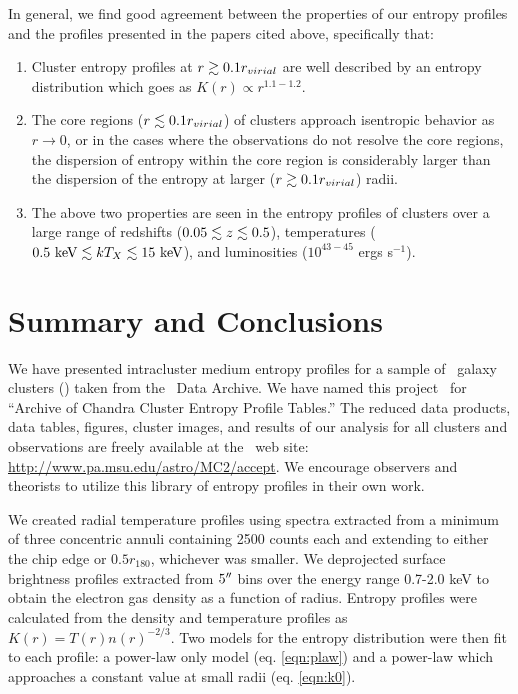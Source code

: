 \documentclass[12pt,preprint]{aastex}
\begin{document}
In general, we find good agreement between the properties of our
entropy profiles and the profiles presented in the papers cited above,
specifically that:
\begin{enumerate}
\item Cluster entropy profiles at $r \gtrsim 0.1 r_{virial}$ are well
  described by an entropy distribution which goes as $K(r) \propto
  r^{1.1-1.2}$.
\item The core regions ($r \lesssim 0.1 r_{virial}$) of clusters approach
  isentropic behavior as $r \rightarrow 0$, or in the cases where the
  observations do not resolve the core regions, the dispersion of
  entropy within the core region is considerably larger than the
  dispersion of the entropy at larger ($r \gtrsim 0.1 r_{virial}$) radii.
\item The above two properties are seen in the entropy profiles of
  clusters over a large range of redshifts ($0.05 \lesssim z \lesssim 0.5$),
  temperatures ($0.5 \mbox{\ensuremath{\mathrm{~keV}}} \lesssim kT_X \lesssim 15 \mbox{\ensuremath{\mathrm{~keV}}}$), and luminosities
  ($10^{43-45}$ ergs s$^{-1}$).
\end{enumerate}  

\section{Summary and Conclusions}
\label{sec:summary}

We have presented intracluster medium entropy profiles for a sample of
\numcluster\ galaxy clusters (\expt) taken from the \chandra\ Data
Archive. We have named this project \accept\ for ``Archive of Chandra
Cluster Entropy Profile Tables.'' The reduced data products, data
tables, figures, cluster images, and results of our analysis for all
clusters and observations are freely available at the \accept\ web
site: \url{http://www.pa.msu.edu/astro/MC2/accept}. We encourage
observers and theorists to utilize this library of entropy profiles in
their own work.

We created radial temperature profiles using spectra extracted from a
minimum of three concentric annuli containing 2500 counts each and
extending to either the chip edge or $0.5 r_{180}$, whichever was
smaller. We deprojected surface brightness profiles extracted from
$5\mathrm{^\prime}\hskip -0.1em\mathrm{^\prime}$ bins over the energy range 0.7-2.0 keV to obtain the electron
gas density as a function of radius. Entropy profiles were calculated
from the density and temperature profiles as $K(r) =
T(r)n(r)^{-2/3}$. Two models for the entropy distribution were then
fit to each profile: a power-law only model (eq. \ref{eqn:plaw}) and
a power-law which approaches a constant value at small radii
(eq. \ref{eqn:k0}).
\end{document}

